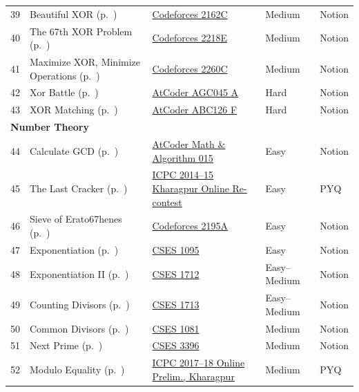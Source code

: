 {\begin{longtable}{r >{\raggedright\arraybackslash}p{4.6cm} >{\raggedright\arraybackslash}p{5.6cm} l l}
39 & Beautiful XOR (p.~\pageref{sec:b-beautiful-xor}) & \href{https://codeforces.com/problemset/problem/2162/C}{Codeforces 2162C} & Medium & Notion\\
40 & The 67th XOR Problem (p.~\pageref{sec:b-67th}) & \href{https://codeforces.com/problemset/problem/2218/E}{Codeforces 2218E} & Medium & Notion\\
41 & Maximize XOR, Minimize Operations (p.~\pageref{sec:b-maximize-xor}) & \href{https://codeforces.com/problemset/problem/2260/C}{Codeforces 2260C} & Medium & Notion\\
42 & Xor Battle (p.~\pageref{sec:b-xor-battle}) & \href{https://atcoder.jp/contests/agc045/tasks/agc045_a}{AtCoder AGC045 A} & Hard & Notion\\
43 & XOR Matching (p.~\pageref{sec:b-xor-matching}) & \href{https://atcoder.jp/contests/abc126/tasks/abc126_f}{AtCoder ABC126 F} & Hard & Notion\\
\multicolumn{5}{l}{\textbf{Number Theory}}\\
44 & Calculate GCD (p.~\pageref{sec:n-gcd}) & \href{https://atcoder.jp/contests/math-and-algorithm/tasks/math_and_algorithm_o}{AtCoder Math \& Algorithm 015} & Easy & Notion\\
45 & The Last Cracker (p.~\pageref{sec:n-last-cracker}) & \href{https://www.codechef.com/problems/ACM14KG2}{ICPC 2014--15 Kharagpur Online Re-contest} & Easy & PYQ\\
46 & Sieve of Erato67henes (p.~\pageref{sec:n-67}) & \href{https://codeforces.com/problemset/problem/2195/A}{Codeforces 2195A} & Easy & Notion\\
47 & Exponentiation (p.~\pageref{sec:n-exp}) & \href{https://cses.fi/problemset/task/1095}{CSES 1095} & Easy & Notion\\
48 & Exponentiation II (p.~\pageref{sec:n-exp2}) & \href{https://cses.fi/problemset/task/1712}{CSES 1712} & Easy--Medium & Notion\\
49 & Counting Divisors (p.~\pageref{sec:n-count-div}) & \href{https://cses.fi/problemset/task/1713}{CSES 1713} & Easy--Medium & Notion\\
50 & Common Divisors (p.~\pageref{sec:n-common-div}) & \href{https://cses.fi/problemset/task/1081}{CSES 1081} & Medium & Notion\\
51 & Next Prime (p.~\pageref{sec:n-next-prime}) & \href{https://cses.fi/problemset/task/3396}{CSES 3396} & Medium & Notion\\
52 & Modulo Equality (p.~\pageref{sec:n-modulo-equality}) & \href{https://www.codechef.com/problems/EQUALMOD}{ICPC 2017--18 Online Prelim., Kharagpur} & Medium & PYQ\\

\end{longtable}}
